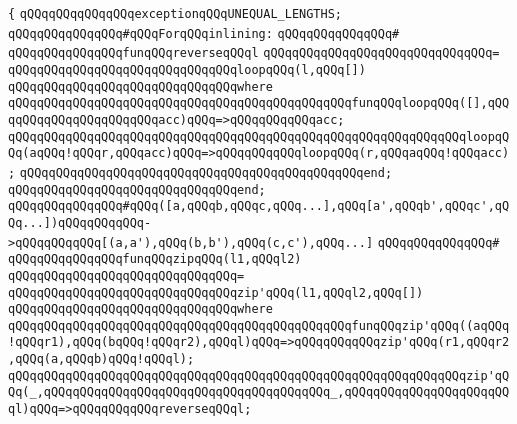 \verb|{|\newline
\verb|qQQqqQQqqQQqqQQqexceptionqQQqUNEQUAL_LENGTHS;|\newline
\newline
\newline
\verb|qQQqqQQqqQQqqQQq#qQQqForqQQqinlining:|\newline
\verb|qQQqqQQqqQQqqQQq#|\newline
\verb|qQQqqQQqqQQqqQQqfunqQQqreverseqQQql|\newline
\verb|qQQqqQQqqQQqqQQqqQQqqQQqqQQqqQQq=|\newline
\verb|qQQqqQQqqQQqqQQqqQQqqQQqqQQqqQQqloopqQQq(l,qQQq[])|\newline
\verb|qQQqqQQqqQQqqQQqqQQqqQQqqQQqqQQqwhere|\newline
\verb|qQQqqQQqqQQqqQQqqQQqqQQqqQQqqQQqqQQqqQQqqQQqqQQqfunqQQqloopqQQq([],qQQqqQQqqQQqqQQqqQQqqQQqacc)qQQq=>qQQqqQQqqQQqacc;|\newline
\verb|qQQqqQQqqQQqqQQqqQQqqQQqqQQqqQQqqQQqqQQqqQQqqQQqqQQqqQQqqQQqqQQqloopqQQq(aqQQq!qQQqr,qQQqacc)qQQq=>qQQqqQQqqQQqloopqQQq(r,qQQqaqQQq!qQQqacc);|\newline
\verb|qQQqqQQqqQQqqQQqqQQqqQQqqQQqqQQqqQQqqQQqqQQqqQQqend;|\newline
\verb|qQQqqQQqqQQqqQQqqQQqqQQqqQQqqQQqend;|\newline
\newline
\newline
\newline
\verb|qQQqqQQqqQQqqQQq#qQQq([a,qQQqb,qQQqc,qQQq...],qQQq[a',qQQqb',qQQqc',qQQq...])qQQqqQQqqQQq->qQQqqQQqqQQq[(a,a'),qQQq(b,b'),qQQq(c,c'),qQQq...]|\newline
\verb|qQQqqQQqqQQqqQQq#|\newline
\verb|qQQqqQQqqQQqqQQqfunqQQqzipqQQq(l1,qQQql2)|\newline
\verb|qQQqqQQqqQQqqQQqqQQqqQQqqQQqqQQq=|\newline
\verb|qQQqqQQqqQQqqQQqqQQqqQQqqQQqqQQqzip'qQQq(l1,qQQql2,qQQq[])|\newline
\verb|qQQqqQQqqQQqqQQqqQQqqQQqqQQqqQQqwhere|\newline
\verb|qQQqqQQqqQQqqQQqqQQqqQQqqQQqqQQqqQQqqQQqqQQqqQQqfunqQQqzip'qQQq((aqQQq!qQQqr1),qQQq(bqQQq!qQQqr2),qQQql)qQQq=>qQQqqQQqqQQqzip'qQQq(r1,qQQqr2,qQQq(a,qQQqb)qQQq!qQQql);|\newline
\verb|qQQqqQQqqQQqqQQqqQQqqQQqqQQqqQQqqQQqqQQqqQQqqQQqqQQqqQQqqQQqqQQqzip'qQQq(_,qQQqqQQqqQQqqQQqqQQqqQQqqQQqqQQqqQQqqQQq_,qQQqqQQqqQQqqQQqqQQqqQQql)qQQq=>qQQqqQQqqQQqreverseqQQql;|\newline
